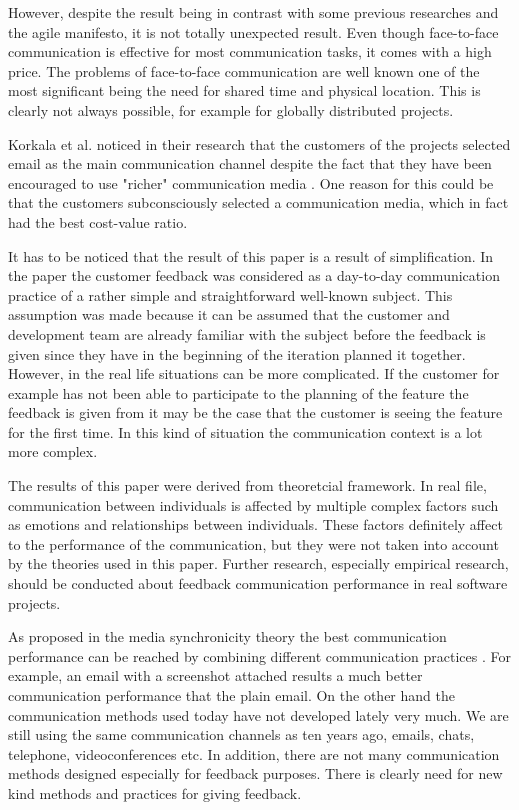 \documentclass[conference]{IEEEtran}
\begin{document}
However, despite the result being in contrast with some previous researches and the agile manifesto, it is not totally unexpected result. Even though face-to-face communication is effective for most communication tasks, it comes with a high price. The problems of face-to-face communication are well known one of the most significant being the need for shared time and physical location. This is clearly not always possible, for example for globally distributed projects.

Korkala et al. noticed in their research that the customers of the projects selected email as the main communication channel despite the fact that they have been encouraged to use "richer" communication media \cite{2006korkala}. One reason for this could be that the customers subconsciously selected a communication media, which in fact had the best cost-value ratio.

It has to be noticed that the result of this paper is a result of simplification. In the paper the customer feedback was considered as a day-to-day communication practice of a rather simple and straightforward well-known subject. This assumption was made because it can be assumed that the customer and development team are already familiar with the subject before the feedback is given since they have in the beginning of the iteration planned it together. However, in the real life situations can be more complicated. If the customer for example has not been able to participate to the planning of the feature the feedback is given from it may be the case that the customer is seeing the feature for the first time. In this kind of situation the communication context is a lot more complex.

The results of this paper were derived from theoretcial framework. In real file, communication between individuals is affected by multiple complex factors such as emotions and relationships between individuals. These factors definitely affect to the performance of the communication, but they were not taken into account by the theories used in this paper. Further research, especially empirical research, should be conducted about feedback communication performance in real software projects.

As proposed in the media synchronicity theory the best communication performance can be reached by combining different communication practices \cite{2008dennis}. For example, an email with a screenshot attached results a much better communication performance that the plain email. On the other hand the communication methods used today have not developed lately very much. We are still using the same communication channels as ten years ago, emails, chats, telephone, videoconferences etc. In addition, there are not many communication methods designed especially for feedback purposes. There is clearly need for new kind methods and practices for giving feedback.
\end{document}
